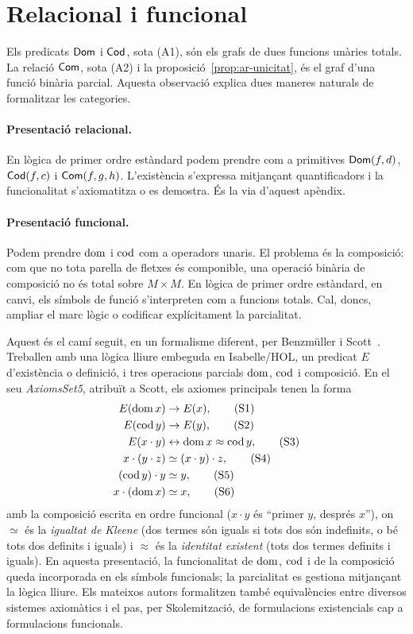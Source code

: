 \section{Relacional i funcional}
\label{sec:ar-relacional-funcional}

Els predicats $\mathsf{Dom}$ i $\mathsf{Cod}$, sota (A1), són els grafs de dues funcions unàries totals. La relació $\mathsf{Com}$, sota (A2) i la proposició~\ref{prop:ar-unicitat}, és el graf d'una funció binària parcial. Aquesta observació explica dues maneres naturals de formalitzar les categories.

\paragraph{Presentació relacional.}
En lògica de primer ordre estàndard podem prendre com a primitives $\mathsf{Dom}(f,d)$, $\mathsf{Cod}(f,c)$ i $\mathsf{Com}(f,g,h)$. L'existència s'expressa mitjançant quantificadors i la funcionalitat s'axiomatitza o es demostra. És la via d'aquest apèndix.

\paragraph{Presentació funcional.}
Podem prendre $\operatorname{dom}$ i $\operatorname{cod}$ com a operadors unaris. El problema és la composició: com que no tota parella de fletxes és componible, una operació binària de composició no és total sobre $M\times M$. En lògica de primer ordre estàndard, en canvi, els símbols de funció s'interpreten com a funcions totals. Cal, doncs, ampliar el marc lògic o codificar explícitament la parcialitat.

Aquest és el camí seguit, en un formalisme diferent, per Benzmüller i Scott~\cite{BS2020,BSAFP}. Treballen amb una lògica lliure embeguda en Isabelle/HOL, un predicat $E$ d'existència o definició, i tres operacions parcials $\operatorname{dom}$, $\operatorname{cod}$ i composició. En el seu \emph{AxiomsSet5}, atribuït a Scott, els axiomes principals tenen la forma
\begin{align*}
E(\operatorname{dom} x)&\to E(x),\tag{S1}\\
E(\operatorname{cod} y)&\to E(y),\tag{S2}\\
E(x\cdot y)&\leftrightarrow \operatorname{dom} x\approx\operatorname{cod} y,\tag{S3}\\
x\cdot(y\cdot z)&\simeq (x\cdot y)\cdot z,\tag{S4}\\
(\operatorname{cod} y)\cdot y&\simeq y,\tag{S5}\\
x\cdot(\operatorname{dom} x)&\simeq x,\tag{S6}
\end{align*}
amb la composició escrita en ordre funcional ($x\cdot y$ és \enquote{primer $y$, després $x$}), on $\simeq$ és la \emph{igualtat de Kleene} (dos termes són iguals si tots dos són indefinits, o bé tots dos definits i iguals) i $\approx$ és la \emph{identitat existent} (tots dos termes definits i iguals). En aquesta presentació, la funcionalitat de $\operatorname{dom}$, $\operatorname{cod}$ i de la composició queda incorporada en els símbols funcionals; la parcialitat es gestiona mitjançant la lògica lliure. Els mateixos autors formalitzen també equivalències entre diversos sistemes axiomàtics i el pas, per Skolemització, de formulacions existencials cap a formulacions funcionals.

